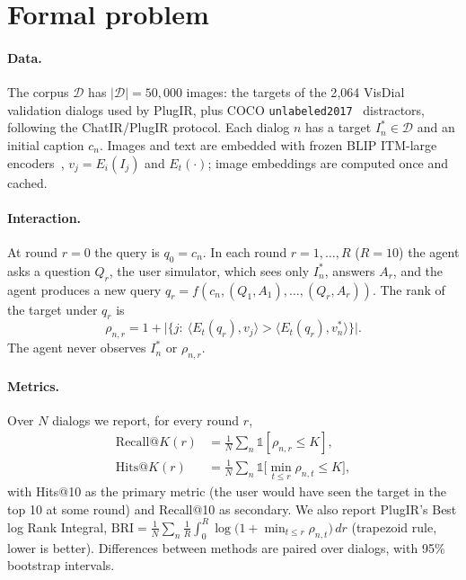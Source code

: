 \documentclass[sigconf,nonacm]{acmart}
\begin{document}
\section{Formal problem}
\label{sec:formal}
\paragraph{Data.} The corpus $\mathcal{D}$ has $|\mathcal{D}|=50{,}000$ images: the targets of the
2{,}064 VisDial~\cite{das2017visdial} validation dialogs used by PlugIR, plus COCO
\texttt{unlabeled2017}~\cite{lin2014coco} distractors, following the ChatIR/PlugIR protocol. Each
dialog $n$ has a target $I^*_n\in\mathcal{D}$ and an initial caption $c_n$. Images and text are
embedded with frozen BLIP ITM-large encoders~\cite{li2022blip}, $v_j=E_i(I_j)$ and $E_t(\cdot)$;
image embeddings are computed once and cached.

\paragraph{Interaction.} At round $r=0$ the query is $q_0=c_n$. In each round $r=1,\dots,R$
($R=10$) the agent asks a question $Q_r$, the user simulator, which sees only $I^*_n$, answers
$A_r$, and the agent produces a new query $q_r=f(c_n,(Q_1,A_1),\dots,(Q_r,A_r))$. The rank of the
target under $q_r$ is
\begin{equation}
\rho_{n,r}=1+\big|\{j:\ \langle E_t(q_r),v_j\rangle>\langle E_t(q_r),v^*_n\rangle\}\big|.
\end{equation}
The agent never observes $I^*_n$ or $\rho_{n,r}$.

\paragraph{Metrics.} Over $N$ dialogs we report, for every round $r$,
\begin{align}
\text{Recall@}K(r)&=\tfrac{1}{N}\textstyle\sum_n \mathbb{1}[\rho_{n,r}\le K],\\
\text{Hits@}K(r)&=\tfrac{1}{N}\textstyle\sum_n \mathbb{1}\big[\min_{t\le r}\rho_{n,t}\le K\big],
\end{align}
with Hits@10 as the primary metric (the user would have seen the target in the top 10 at some
round) and Recall@10 as secondary. We also report PlugIR's Best log Rank Integral,
$\text{BRI}=\frac{1}{N}\sum_n \frac{1}{R}\int_0^R \log\big(1+\min_{t\le r}\rho_{n,t}\big)\,dr$
(trapezoid rule, lower is better). Differences between methods are paired over dialogs, with 95\%
bootstrap intervals.
\end{document}
